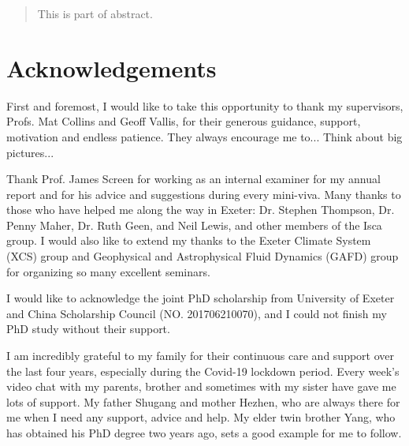 
\maketitle

\begin{abstract}
This is part of abstract.
\end{abstract}

\makedeclaration

\newpage
\chapter*{Acknowledgements}
First and foremost, I would like to take this opportunity to thank my supervisors, Profs. Mat Collins and Geoff Vallis, for their generous guidance, support, motivation and endless patience. They always encourage me to... Think about big pictures...

Thank Prof. James Screen for working as an internal examiner for my annual report and for his advice and suggestions during every mini-viva. 
Many thanks to those who have helped me along the way in Exeter: Dr. Stephen Thompson, Dr. Penny Maher, Dr. Ruth Geen, and Neil Lewis, and other members of the Isca group. I would also like to extend my thanks to the Exeter Climate System (XCS) group and Geophysical and Astrophysical Fluid Dynamics (GAFD) group for organizing so many excellent seminars.

I would like to acknowledge the joint PhD scholarship from University of Exeter and China Scholarship Council (NO. 201706210070), and I could not finish my PhD study without their support.

I am incredibly grateful to my family for their continuous care and support over the last four years, especially during the Covid-19 lockdown period. Every week's video chat with my parents, brother and sometimes with my sister have gave me lots of support. My father Shugang and mother Hezhen, who are always there for me when I need any support, advice and help. My elder twin brother Yang, who has obtained his PhD degree two years ago, sets a good example for me to follow. %

